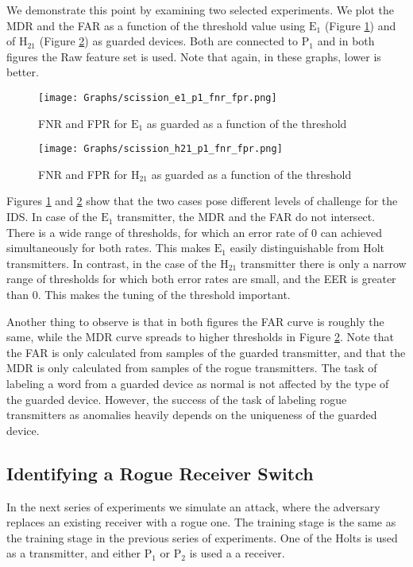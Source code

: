 \documentclass[conference]{IEEEtran}
\begin{document}
  We demonstrate this point by examining two selected experiments. We plot the MDR and the FAR as a function of the threshold value using \(\text{E}_1\) (Figure \ref{fig:detection_easy_example}) and of \(\text{H}_{21}\) (Figure \ref{fig:detection_difficult_example}) as guarded devices. Both are connected to \(\text{P}_1\) and in both figures the Raw feature set is used. Note that again, in these graphs, lower is better.
  
  \begin{figure}[t]
    \centering
    \texttt{[image: Graphs/scission\_e1\_p1\_fnr\_fpr.png]}
    \caption{FNR and FPR for \(\text{E}_1\) as guarded as a function of the threshold}
    \label{fig:detection_easy_example}
  \end{figure}
  
  \begin{figure}[t]
    \centering
    \texttt{[image: Graphs/scission\_h21\_p1\_fnr\_fpr.png]}
    \caption{FNR and FPR for \(\text{H}_{21}\) as guarded as a function of the threshold}
    \label{fig:detection_difficult_example}
  \end{figure}
  
  Figures \ref{fig:detection_easy_example} and \ref{fig:detection_difficult_example} show that the two cases pose different levels of challenge for the IDS.
  In case of the \(\text{E}_1\) transmitter, the MDR and the FAR do not intersect. There is a wide range of thresholds, for which an error rate of 0 can achieved simultaneously for both rates. This makes \(\text{E}_1\) easily distinguishable from Holt transmitters. In contrast, in the case of the \(\text{H}_{21}\) transmitter there is only a narrow range of thresholds for which both error rates are small, and the EER is greater than 0. This makes the tuning of the threshold important.
  
  Another thing to observe is that in both figures the FAR curve is roughly the same, while the MDR curve spreads to higher thresholds in Figure \ref{fig:detection_difficult_example}. Note that the FAR is only calculated from samples of the guarded transmitter, and that the MDR is only calculated from samples of the rogue transmitters. The task of labeling a word from a guarded device as normal is not affected by the type of the guarded device. However, the success of the task of labeling rogue transmitters as anomalies heavily depends on the uniqueness of the guarded device.
   
\subsection{Identifying a Rogue Receiver Switch}
  In the next series of experiments we simulate an attack, where the adversary replaces an existing receiver with a rogue one. The training stage is the same as the training stage in the previous series of experiments. One of the Holts is used as a transmitter, and either \(\text{P}_1\) or \(\text{P}_2\) is used a a receiver.
  
\end{document}
